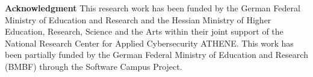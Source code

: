 \documentclass[10pt,twocolumn,letterpaper]{article}
\begin{document}
\textbf{Acknowledgment}
This research work has been funded by the German Federal Ministry of Education and Research and the Hessian Ministry of Higher Education, Research, Science and the Arts within their joint support of the National Research Center for Applied Cybersecurity ATHENE. This work has been partially funded by the German Federal Ministry of Education and Research (BMBF) through the Software Campus Project.




{\small


}
\end{document}
